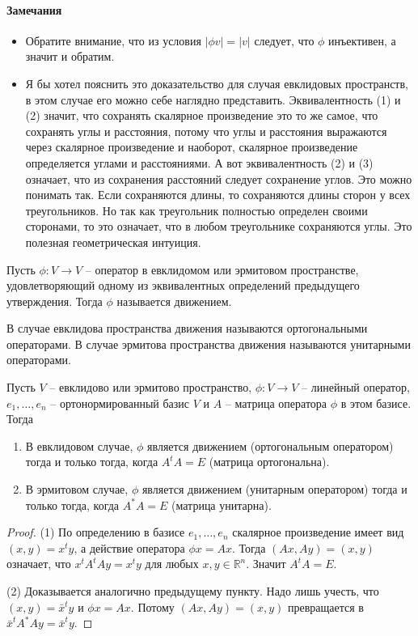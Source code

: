 \paragraph{Замечания}
\begin{itemize}
\item Обратите внимание, что из условия $|\phi v| = |v|$ следует, что $\phi$ инъективен, а значит и обратим.

\item Я бы хотел пояснить это доказательство для случая евклидовых пространств, в этом случае его можно себе наглядно представить. Эквивалентность (1) и (2) значит, что сохранять скалярное произведение это то же самое, что сохранять углы и расстояния, потому что углы и расстояния выражаются через скалярное произведение и наоборот, скалярное произведение определяется углами и расстояниями. А вот эквивалентность (2) и (3) означает, что из сохранения расстояний следует сохранение углов. Это можно понимать так. Если сохраняются длины, то сохраняются длины сторон у всех треугольников. Но так как треугольник полностью определен своими сторонами, то это означает, что в любом треугольнике сохраняются углы. Это полезная геометрическая интуиция.
\end{itemize}


\begin{definition}
Пусть $\phi\colon V\to V$ -- оператор в евклидомом или эрмитовом пространстве, удовлетворяющий одному из эквивалентных определений предыдущего утверждения. Тогда $\phi$ называется движением. 

В случае евклидова пространства движения называются ортогональными операторами. В случае эрмитова пространства движения называются унитарными операторами.
\end{definition}



\begin{claim}\label{claim::MovementMatrix}
Пусть $V$ -- евклидово или эрмитово пространство, $\phi\colon V\to V$ -- линейный оператор, $e_1,\ldots,e_n$ -- ортонормированный базис $V$ и $A$ -- матрица оператора $\phi$ в этом базисе. Тогда
\begin{enumerate}
\item В евклидовом случае, $\phi$ является движением (ортогональным оператором) тогда и только тогда, когда $A^t A = E$ (матрица ортогональна).
\item В эрмитовом случае, $\phi$ является движением (унитарным оператором) тогда и только тогда, когда $A^*A = E$ (матрица унитарна).
\end{enumerate}
\end{claim}
\begin{proof}
(1) По определению в базисе $e_1,\ldots,e_n$ скалярное произведение имеет вид $(x,y) = x^t y$, а действие оператора $\phi x = A x$. Тогда $(Ax, Ay) = (x, y)$ означает, что $x^t A^t A y = x^t y$ для любых $x,y\in \mathbb R^n$. Значит $A^t A = E$.

(2) Доказывается аналогично предыдущему пункту. Надо лишь учесть, что $(x, y) = \bar x^t y$ и $\phi x = Ax$. Потому $(Ax, Ay) = (x,y)$ превращается в $\bar x^t A^* A y = \bar x^t y$.
\end{proof}

